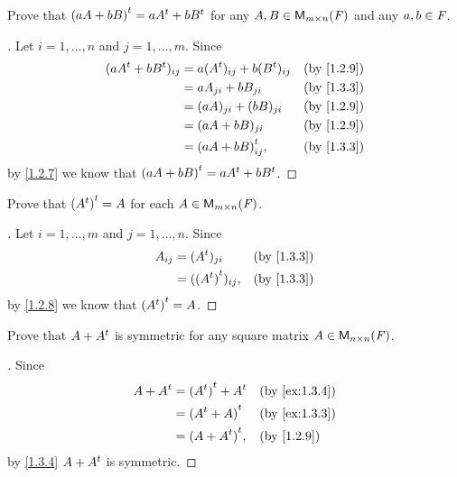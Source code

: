 \exercisesection

\setcounter{ex}{2}
\begin{ex}\label{ex:1.3.3}
  Prove that \({(aA + bB)}^{t} = a{A}^{t} + b{B}^{t}\) for any \(A, B \in \ms[m][n][\F]\) and any \(a, b \in \mathit{F}\).
\end{ex}

\begin{proof}[]
  Let \(i = 1, \dots, n\) and \(j = 1, \dots, m\).
  Since
  \begin{align*}
    (a\tp{A} + b\tp{B})_{i j} & = a(\tp{A})_{i j} + b(\tp{B})_{i j} &  & \by{1.2.9} \\
                              & = aA_{j i} + bB_{j i}               &  & \by{1.3.3} \\
                              & = (aA)_{j i} + (bB)_{j i}           &  & \by{1.2.9} \\
                              & = (aA + bB)_{j i}                   &  & \by{1.2.9} \\
                              & = \tp{(aA + bB)}_{i j},             &  & \by{1.3.3}
  \end{align*}
  by \cref{1.2.7} we know that \({(aA + bB)}^{t} = a{A}^{t} + b{B}^{t}\).
\end{proof}

\begin{ex}\label{ex:1.3.4}
  Prove that \({({A}^{t})}^{t} = A\) for each \(A \in \ms\).
\end{ex}

\begin{proof}[]
  Let \(i = 1, \dots, m\) and \(j = 1, \dots, n\).
  Since
  \begin{align*}
    A_{i j} & = (\tp{A})_{j i}         &  & \by{1.3.3} \\
            & = (\tp{(\tp{A})})_{i j}, &  & \by{1.3.3}
  \end{align*}
  by \cref{1.2.8} we know that \({({A}^{t})}^{t} = A\).
\end{proof}

\begin{ex}\label{ex:1.3.5}
  Prove that \(A + {A}^{t}\) is symmetric for any square matrix \(A \in \ms[n][n][\F]\).
\end{ex}

\begin{proof}[]
  Since
  \begin{align*}
    A + \tp{A} & = \tp{(\tp{A})} + \tp{A} &  & \by{ex:1.3.4} \\
               & = \tp{(\tp{A} + A)}      &  & \by{ex:1.3.3} \\
               & = \tp{(A + \tp{A})},     &  & \by{1.2.9}
  \end{align*}
  by \cref{1.3.4} \(A + {A}^{t}\) is symmetric.
\end{proof}

